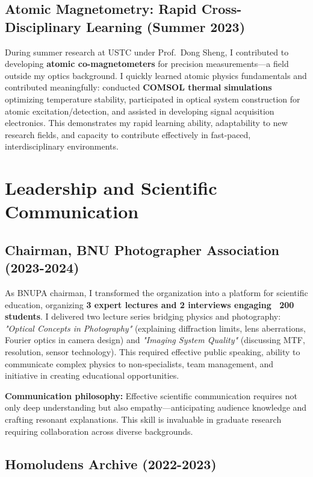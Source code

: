 \documentclass[11pt,a4paper]{article}
\begin{document}
\subsection{Atomic Magnetometry: Rapid Cross-Disciplinary Learning (Summer 2023)}

During summer research at USTC under Prof.~Dong Sheng, I contributed to developing \textbf{atomic co-magnetometers} for precision measurements—a field outside my optics background. I quickly learned atomic physics fundamentals and contributed meaningfully: conducted \textbf{COMSOL thermal simulations} optimizing temperature stability, participated in optical system construction for atomic excitation/detection, and assisted in developing signal acquisition electronics. This demonstrates my rapid learning ability, adaptability to new research fields, and capacity to contribute effectively in fast-paced, interdisciplinary environments.

\section{Leadership and Scientific Communication}

\subsection{Chairman, BNU Photographer Association (2023-2024)}

As BNUPA chairman, I transformed the organization into a platform for scientific education, organizing \textbf{3 expert lectures and 2 interviews engaging ~200 students}. I delivered two lecture series bridging physics and photography: \textit{"Optical Concepts in Photography"} (explaining diffraction limits, lens aberrations, Fourier optics in camera design) and \textit{"Imaging System Quality"} (discussing MTF, resolution, sensor technology). This required effective public speaking, ability to communicate complex physics to non-specialists, team management, and initiative in creating educational opportunities.

\textbf{Communication philosophy:} Effective scientific communication requires not only deep understanding but also empathy—anticipating audience knowledge and crafting resonant explanations. This skill is invaluable in graduate research requiring collaboration across diverse backgrounds.

\subsection{Homoludens Archive (2022-2023)}
\end{document}
